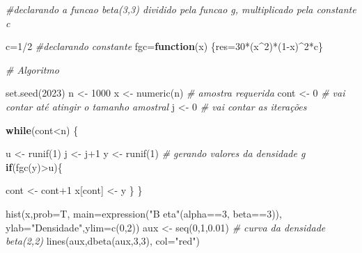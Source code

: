 \documentclass[
]{article}
\newenvironment{Shaded}{\begin{snugshade}}{\end{snugshade}}
\newcommand{\AttributeTok}[1]{\textcolor[rgb]{0.77,0.63,0.00}{#1}}
\newcommand{\CommentTok}[1]{\textcolor[rgb]{0.56,0.35,0.01}{\textit{#1}}}
\newcommand{\ControlFlowTok}[1]{\textcolor[rgb]{0.13,0.29,0.53}{\textbf{#1}}}
\newcommand{\DecValTok}[1]{\textcolor[rgb]{0.00,0.00,0.81}{#1}}
\newcommand{\FloatTok}[1]{\textcolor[rgb]{0.00,0.00,0.81}{#1}}
\newcommand{\FunctionTok}[1]{\textcolor[rgb]{0.00,0.00,0.00}{#1}}
\newcommand{\NormalTok}[1]{#1}
\newcommand{\OtherTok}[1]{\textcolor[rgb]{0.56,0.35,0.01}{#1}}
\newcommand{\SpecialCharTok}[1]{\textcolor[rgb]{0.00,0.00,0.00}{#1}}
\newcommand{\StringTok}[1]{\textcolor[rgb]{0.31,0.60,0.02}{#1}}
\begin{document}
\begin{Shaded}
\begin{Highlighting}[]
\CommentTok{\#declarando a funcao beta(3,3) dividido pela funcao g, multiplicado pela constante c}

\NormalTok{c}\OtherTok{=}\DecValTok{1}\SpecialCharTok{/}\DecValTok{2} \CommentTok{\#declarando constante}
\NormalTok{fgc}\OtherTok{=}\ControlFlowTok{function}\NormalTok{(x)}
\NormalTok{    \{res}\OtherTok{=}\DecValTok{30}\SpecialCharTok{*}\NormalTok{(x}\SpecialCharTok{\^{}}\DecValTok{2}\NormalTok{)}\SpecialCharTok{*}\NormalTok{(}\DecValTok{1}\SpecialCharTok{{-}}\NormalTok{x)}\SpecialCharTok{\^{}}\DecValTok{2}\SpecialCharTok{*}\NormalTok{c\}}

\CommentTok{\# Algoritmo  }

\FunctionTok{set.seed}\NormalTok{(}\DecValTok{2023}\NormalTok{)}
\NormalTok{n }\OtherTok{\textless{}{-}} \DecValTok{1000}
\NormalTok{x }\OtherTok{\textless{}{-}} \FunctionTok{numeric}\NormalTok{(n) }\CommentTok{\# amostra requerida }
\NormalTok{cont }\OtherTok{\textless{}{-}} \DecValTok{0}  \CommentTok{\# vai contar até atingir o tamanho amostral}
\NormalTok{j }\OtherTok{\textless{}{-}} \DecValTok{0} \CommentTok{\# vai contar as iterações }

\ControlFlowTok{while}\NormalTok{(cont}\SpecialCharTok{\textless{}}\NormalTok{n)}
\NormalTok{\{}
  
\NormalTok{  u }\OtherTok{\textless{}{-}} \FunctionTok{runif}\NormalTok{(}\DecValTok{1}\NormalTok{)}
\NormalTok{  j }\OtherTok{\textless{}{-}}\NormalTok{ j}\SpecialCharTok{+}\DecValTok{1}
\NormalTok{  y }\OtherTok{\textless{}{-}} \FunctionTok{runif}\NormalTok{(}\DecValTok{1}\NormalTok{) }\CommentTok{\# gerando valores da densidade g}
  \ControlFlowTok{if}\NormalTok{(}\FunctionTok{fgc}\NormalTok{(y)}\SpecialCharTok{\textgreater{}}\NormalTok{u)\{}
    
\NormalTok{    cont }\OtherTok{\textless{}{-}}\NormalTok{ cont}\SpecialCharTok{+}\DecValTok{1} 
\NormalTok{    x[cont] }\OtherTok{\textless{}{-}}\NormalTok{ y}
\NormalTok{                \}}
\NormalTok{\}}

\FunctionTok{hist}\NormalTok{(x,}\AttributeTok{prob=}\NormalTok{T, }\AttributeTok{main=}\FunctionTok{expression}\NormalTok{(}\StringTok{"B eta"}\NormalTok{(alpha}\SpecialCharTok{==}\DecValTok{3}\NormalTok{, beta}\SpecialCharTok{==}\DecValTok{3}\NormalTok{)), }\AttributeTok{ylab=}\StringTok{"Densidade"}\NormalTok{,}\AttributeTok{ylim=}\FunctionTok{c}\NormalTok{(}\DecValTok{0}\NormalTok{,}\DecValTok{2}\NormalTok{))   }
\NormalTok{aux }\OtherTok{\textless{}{-}} \FunctionTok{seq}\NormalTok{(}\DecValTok{0}\NormalTok{,}\DecValTok{1}\NormalTok{,}\FloatTok{0.01}\NormalTok{)}
\CommentTok{\# curva da densidade beta(2,2)}
\FunctionTok{lines}\NormalTok{(aux,}\FunctionTok{dbeta}\NormalTok{(aux,}\DecValTok{3}\NormalTok{,}\DecValTok{3}\NormalTok{), }\AttributeTok{col=}\StringTok{"red"}\NormalTok{) }
\end{Highlighting}
\end{Shaded}
\end{document}
